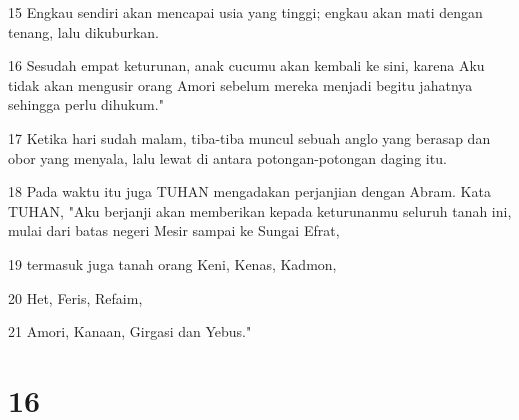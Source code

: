 \par 15 Engkau sendiri akan mencapai usia yang tinggi; engkau akan mati dengan tenang, lalu dikuburkan.
\par 16 Sesudah empat keturunan, anak cucumu akan kembali ke sini, karena Aku tidak akan mengusir orang Amori sebelum mereka menjadi begitu jahatnya sehingga perlu dihukum."
\par 17 Ketika hari sudah malam, tiba-tiba muncul sebuah anglo yang berasap dan obor yang menyala, lalu lewat di antara potongan-potongan daging itu.
\par 18 Pada waktu itu juga TUHAN mengadakan perjanjian dengan Abram. Kata TUHAN, "Aku berjanji akan memberikan kepada keturunanmu seluruh tanah ini, mulai dari batas negeri Mesir sampai ke Sungai Efrat,
\par 19 termasuk juga tanah orang Keni, Kenas, Kadmon,
\par 20 Het, Feris, Refaim,
\par 21 Amori, Kanaan, Girgasi dan Yebus."

\chapter{16}

